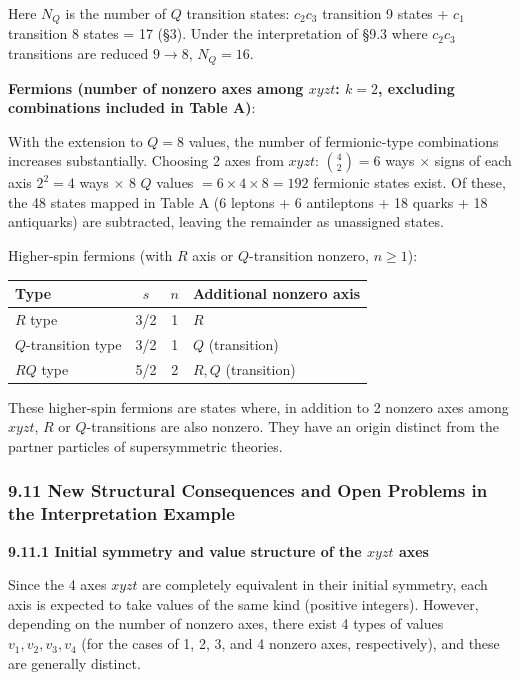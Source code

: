 \documentclass[
  a4paper,11pt]{article}
\newcounter{none}
\theoremstyle{definition}
\theoremstyle{remark}
\begin{document}
Here \(N_Q\) is the number of \(Q\) transition states: \(c_2 c_3\)
transition 9 states + \(c_1\) transition 8 states = 17 (§3). Under the
interpretation of §9.3 where \(c_2 c_3\) transitions are reduced
\(9 \to 8\), \(N_Q = 16\).

\textbf{Fermions (number of nonzero axes among \(xyzt\): \(k = 2\),
excluding combinations included in Table A)}:

With the extension to \(Q = 8\) values, the number of fermionic-type
combinations increases substantially. Choosing 2 axes from \(xyzt\):
\(\binom{4}{2} = 6\) ways \(\times\) signs of each axis \(2^2 = 4\) ways
\(\times\) 8 \(Q\) values \(= 6 \times 4 \times 8 = 192\) fermionic
states exist. Of these, the 48 states mapped in Table A (6 leptons + 6
antileptons + 18 quarks + 18 antiquarks) are subtracted, leaving the
remainder as unassigned states.

Higher-spin fermions (with \(R\) axis or \(Q\)-transition nonzero,
\(n \geq 1\)):

{\def\LTcaptype{none} %
\begin{longtable}[]{@{}lccl@{}}
\toprule\noalign{}
Type & \(s\) & \(n\) & Additional nonzero axis \\
\midrule\noalign{}
\endhead
\bottomrule\noalign{}
\endlastfoot
\(R\) type & 3/2 & 1 & \(R\) \\
\(Q\)-transition type & 3/2 & 1 & \(Q\) (transition) \\
\(RQ\) type & 5/2 & 2 & \(R, Q\) (transition) \\
\end{longtable}
}

These higher-spin fermions are states where, in addition to 2 nonzero
axes among \(xyzt\), \(R\) or \(Q\)-transitions are also nonzero. They
have an origin distinct from the partner particles of supersymmetric
theories.

\subsubsection{9.11 New Structural Consequences and Open Problems in the
Interpretation
Example}\label{new-structural-consequences-and-open-problems-in-the-interpretation-example}

\textbf{9.11.1 Initial symmetry and value structure of the \(xyzt\)
axes}

Since the 4 axes \(xyzt\) are completely equivalent in their initial
symmetry, each axis is expected to take values of the same kind
(positive integers). However, depending on the number of nonzero axes,
there exist 4 types of values \(v_1, v_2, v_3, v_4\) (for the cases of
1, 2, 3, and 4 nonzero axes, respectively), and these are generally
distinct.
\end{document}
